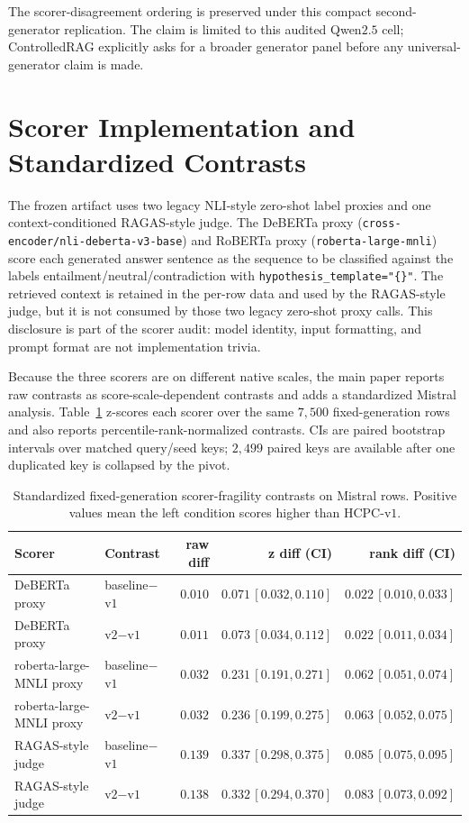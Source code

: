 The scorer-disagreement ordering is preserved under this compact
second-generator replication. The claim is limited to this audited
Qwen$2.5$ cell; ControlledRAG explicitly asks for a broader generator
panel before any universal-generator claim is made.

\section{Scorer Implementation and Standardized Contrasts}
\label{app:scorer_standardized}

The frozen artifact uses two legacy NLI-style zero-shot label proxies
and one context-conditioned RAGAS-style judge. The DeBERTa proxy
(\nolinkurl{cross-encoder/nli-deberta-v3-base}) and RoBERTa proxy
(\nolinkurl{roberta-large-mnli}) score each generated answer sentence
as the sequence to be classified against the labels
entailment/neutral/contradiction with
\texttt{hypothesis\_template="\{\}"}. The retrieved context is retained
in the per-row data and used by the RAGAS-style judge, but it is not
consumed by those two legacy zero-shot proxy calls. This disclosure is
part of the scorer audit: model identity, input formatting, and prompt
format are not implementation trivia.

Because the three scorers are on different native scales, the main
paper reports raw contrasts as score-scale-dependent contrasts and
adds a standardized Mistral analysis. Table~\ref{tab:supp:standardized}
z-scores each scorer over the same $7{,}500$ fixed-generation rows and
also reports percentile-rank-normalized contrasts. CIs are paired
bootstrap intervals over matched query/seed keys; $2{,}499$ paired keys
are available after one duplicated key is collapsed by the pivot.

\begin{table}[!htb]
\centering
\caption{Standardized fixed-generation scorer-fragility contrasts on
Mistral rows. Positive values mean the left condition scores higher
than HCPC-v$1$.}
\label{tab:supp:standardized}
\scriptsize
\begin{tabular}{llrrr}
\toprule
Scorer & Contrast & raw diff & z diff (CI) & rank diff (CI) \\
\midrule
DeBERTa proxy & baseline$-$v$1$ & $0.010$ & $0.071\,[0.032,0.110]$ & $0.022\,[0.010,0.033]$ \\
DeBERTa proxy & v$2$$-$v$1$ & $0.011$ & $0.073\,[0.034,0.112]$ & $0.022\,[0.011,0.034]$ \\
roberta-large-MNLI proxy & baseline$-$v$1$ & $0.032$ & $0.231\,[0.191,0.271]$ & $0.062\,[0.051,0.074]$ \\
roberta-large-MNLI proxy & v$2$$-$v$1$ & $0.032$ & $0.236\,[0.199,0.275]$ & $0.063\,[0.052,0.075]$ \\
RAGAS-style judge & baseline$-$v$1$ & $0.139$ & $0.337\,[0.298,0.375]$ & $0.085\,[0.075,0.095]$ \\
RAGAS-style judge & v$2$$-$v$1$ & $0.138$ & $0.332\,[0.294,0.370]$ & $0.083\,[0.073,0.092]$ \\
\bottomrule
\end{tabular}
\end{table}


